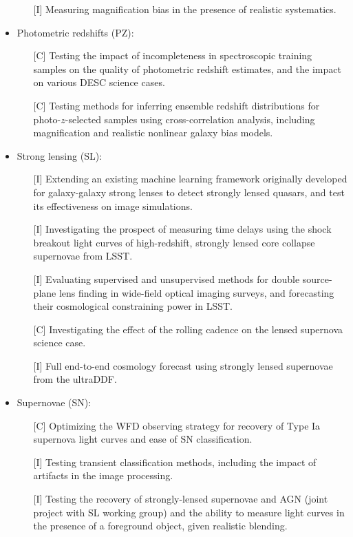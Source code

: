 \documentclass[preprint,times]{aastex61}
\begin{document}
\begin{itemize}
\begin{enumerate}
\item[{[I]}] Measuring magnification bias in the presence of realistic systematics.
\end{enumerate}
\item Photometric redshifts (PZ):
\begin{enumerate}
\item[{[C]}] Testing the impact of incompleteness in spectroscopic training samples on the quality of photometric redshift estimates, and the impact on various DESC science cases.
\item[{[C]}] Testing methods for inferring ensemble redshift distributions for photo-$z$-selected samples using cross-correlation analysis, including magnification and realistic nonlinear galaxy bias models.
\end{enumerate}
\item Strong lensing (SL):
\begin{enumerate}
\item[{[I]}] Extending an existing machine learning framework originally developed for galaxy-galaxy strong lenses to detect strongly lensed quasars, and test its effectiveness on image simulations.
\item[{[I]}] Investigating the prospect of measuring time delays using the shock breakout light curves of  high-redshift, strongly lensed core collapse supernovae from LSST.
\item[{[I]}] Evaluating supervised and unsupervised methods for double source-plane lens finding in wide-field optical imaging surveys, and forecasting their cosmological constraining power in LSST.
\item[{[C]}] Investigating the effect of the rolling cadence on the lensed supernova science case.
\item[{[I]}]  Full end-to-end cosmology forecast using strongly lensed supernovae from the ultraDDF.
\end{enumerate}
\item Supernovae (SN):
\begin{enumerate}
\item[{[C]}] Optimizing the WFD observing strategy for recovery of Type Ia supernova light curves and ease of SN classification.
\item[{[I]}] Testing transient classification methods, including the impact of artifacts in the image processing.
\item[{[I]}] Testing the recovery of strongly-lensed supernovae and AGN (joint project with SL working group) and the ability to measure light curves in the presence of a foreground object, given realistic blending.

\end{enumerate}
\end{itemize}
\end{document}
